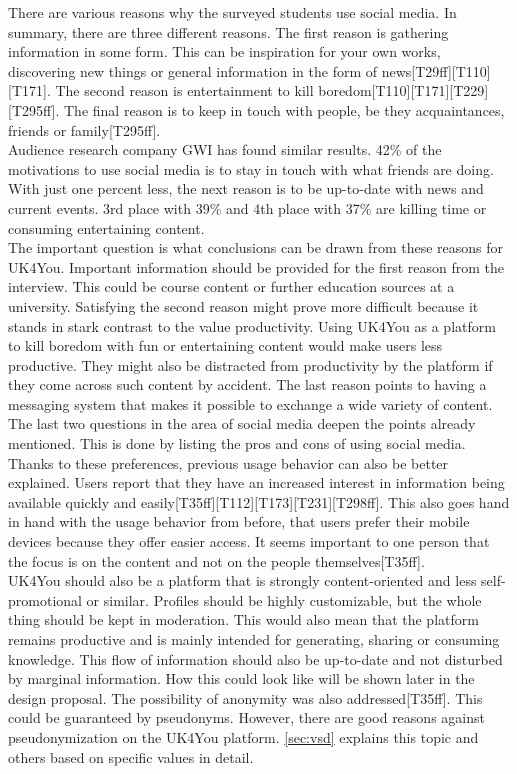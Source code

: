 There are various reasons why the surveyed students use social media.
In summary, there are three different reasons.
The first reason is gathering information in some form.
This can be inspiration for your own works, discovering new things or general information in the form of news[T29ff][T110][T171].
The second reason is entertainment to kill boredom[T110][T171][T229][T295ff].
The final reason is to keep in touch with people, be they acquaintances, friends or family[T295ff].\\

Audience research company GWI has found similar results\cite{gwi-top-10-reasons}.
42\% of the motivations to use social media is to stay in touch with what friends are doing.
With just one percent less, the next reason is to be up-to-date with news and current events.
3rd place with 39\% and 4th place with 37\% are killing time or consuming entertaining content.\\

The important question is what conclusions can be drawn from these reasons for UK4You.
Important information should be provided for the first reason from the interview.
This could be course content or further education sources at a university.
Satisfying the second reason might prove more difficult because it stands in stark contrast to the value productivity.
Using UK4You as a platform to kill boredom with fun or entertaining content would make users less productive.
They might also be distracted from productivity by the platform if they come across such content by accident.
The last reason points to having a messaging system that makes it possible to exchange a wide variety of content.\\

The last two questions in the area of social media deepen the points already mentioned.
This is done by listing the pros and cons of using social media.
Thanks to these preferences, previous usage behavior can also be better explained.
Users report that they have an increased interest in information being available quickly and easily[T35ff][T112][T173][T231][T298ff].
This also goes hand in hand with the usage behavior from before, that users prefer their mobile devices because they offer easier access.
It seems important to one person that the focus is on the content and not on the people themselves[T35ff].\\

UK4You should also be a platform that is strongly content-oriented and less self-promotional or similar.
Profiles should be highly customizable, but the whole thing should be kept in moderation.
This would also mean that the platform remains productive and is mainly intended for generating, sharing or consuming knowledge.
This flow of information should also be up-to-date and not disturbed by marginal information.
How this could look like will be shown later in the design proposal.
The possibility of anonymity was also addressed[T35ff].
This could be guaranteed by pseudonyms.
However, there are good reasons against pseudonymization on the UK4You platform.
\autoref{sec:vsd} explains this topic and others based on specific values in detail.\\

